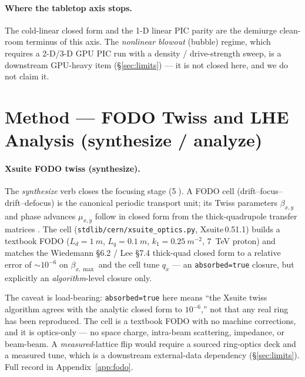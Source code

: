 \documentclass[11pt,a4paper]{article}
\begin{document}
\paragraph{Where the tabletop axis stops.} The cold-linear closed form
and the 1-D linear PIC parity are the demiurge clean-room terminus of
this axis. The \emph{nonlinear blowout} (bubble) regime, which requires a
2-D/3-D GPU PIC run with a density / drive-strength sweep, is a
downstream GPU-heavy item (\S\ref{sec:limits}) --- it is not closed here,
and we do not claim it.

\section{Method --- FODO Twiss and LHE Analysis (synthesize / analyze)}
\label{sec:fodo}

\paragraph{Xsuite FODO twiss (synthesize).} The \emph{synthesize} verb
closes the focusing stage (\textcircled{\scriptsize 5}). A FODO cell
(drift--focus--drift--defocus) is the canonical periodic transport unit;
its Twiss parameters $\beta_{x,y}$ and phase advances $\mu_{x,y}$ follow
in closed form from the thick-quadrupole transfer matrices
\citep{wiedemann2015,lee2004}. The cell (\verb|stdlib/cern/xsuite_optics.py|,
Xsuite\,0.51.1) builds a textbook FODO ($L_d\!=\!\SI{1}{m}$,
$L_q\!=\!\SI{0.1}{m}$, $k_1\!=\!\SI{0.25}{m^{-2}}$, \SI{7}{TeV} proton)
and matches the Wiedemann \S6.2 / Lee \S7.4 thick-quad closed form to a
relative error of $\sim\!10^{-6}$ on $\beta_{x,\max}$ and the cell tune
$q_x$ --- an \texttt{absorbed=true} closure, but explicitly an
\emph{algorithm}-level closure only.

The caveat is load-bearing: \texttt{absorbed=true} here means ``the
Xsuite twiss algorithm agrees with the analytic closed form to
$10^{-6}$,'' not that any real ring has been reproduced. The cell is a
textbook FODO with no machine corrections, and it is optics-only --- no
space charge, intra-beam scattering, impedance, or beam-beam. A
\emph{measured}-lattice flip would require a sourced ring-optics deck and
a measured tune, which is a downstream external-data dependency
(\S\ref{sec:limits}). Full record in Appendix~\ref{app:fodo}.
\end{document}
